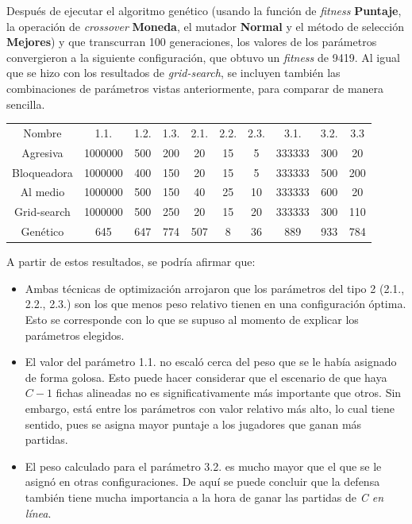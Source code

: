 \documentclass[12pt,a4paper]{article}
\begin{document}
    Después de ejecutar el algoritmo genético (usando la función de \textit{fitness} \textbf{Puntaje}, la operación de \textit{crossover} \textbf{Moneda}, el mutador \textbf{Normal} y el método de selección \textbf{Mejores})  y que transcurran 100 generaciones, los valores de los parámetros convergieron a la siguiente configuración, que obtuvo un \textit{fitness} de 9419. Al igual que se hizo con los resultados de \textit{grid-search}, se incluyen también las combinaciones de parámetros vistas anteriormente, para comparar de manera sencilla.
    
    \begin{center}
		\begin{tabular}{ | c || c | c | c | c | c | c | c | c | c | }
		\hline
		Nombre &  1.1. &  1.2. &  1.3. &  2.1. &  2.2. &  2.3. &  3.1. &  3.2. &  3.3 \\ \hhline{|=#=|=|=|=|=|=|=|=|=|}
		    Agresiva &  1000000 &  500 &  200 &  20 &  15 &  5 &  333333 &  300 &  20 \\ \hline
		    Bloqueadora &  1000000 &  400 &  150 &  20 &  15 &  5 &  333333 &  500 &  200 \\ \hline
		    Al medio &  1000000 &  500 &  150 &  40 &  25 &  10 &  333333 &  600 &  20 \\ \hline
		    Grid-search &  1000000 &  500 &  250 &  20 &  15 &  20 &  333333 &  300 &  110 \\ \hline
		    Genético &  645 &  647 &  774 &  507 &  8 &  36 &  889 &  933 &  784 \\ \hline
		\end{tabular}
    \end{center}
    
    A partir de estos resultados, se podría afirmar que:
        \begin{itemize}
            \item Ambas técnicas de optimización arrojaron que los parámetros del tipo 2 (2.1., 2.2., 2.3.) son los que menos peso relativo tienen en una configuración óptima. Esto se corresponde con lo que se supuso al momento de explicar los parámetros elegidos.
            \item El valor del parámetro 1.1. no escaló cerca del peso que se le había asignado de forma golosa. Esto puede hacer considerar que el escenario de que haya $C-1$ fichas alineadas no es significativamente más importante que otros. Sin embargo, está entre los parámetros con valor relativo más alto, lo cual tiene sentido, pues se asigna mayor puntaje a los jugadores que ganan más partidas.
            \item El peso calculado para el parámetro 3.2. es mucho mayor que el que se le asignó en otras configuraciones. De aquí se puede concluir que la defensa también tiene mucha importancia a la hora de ganar las partidas de \textit{C en línea}.
        \end{itemize}
    
\end{document}
